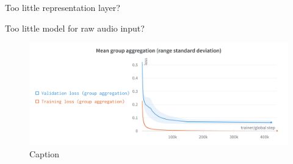 Too little representation layer?

Too little model for raw audio input? \cite{verydeep}

\begin{figure}
    \centering
    \includegraphics[width=\textwidth]{figures/images/Mean group aggregation.png}
    \caption{Caption}
    \label{fig:enter-label}
\end{figure}



\newpage


